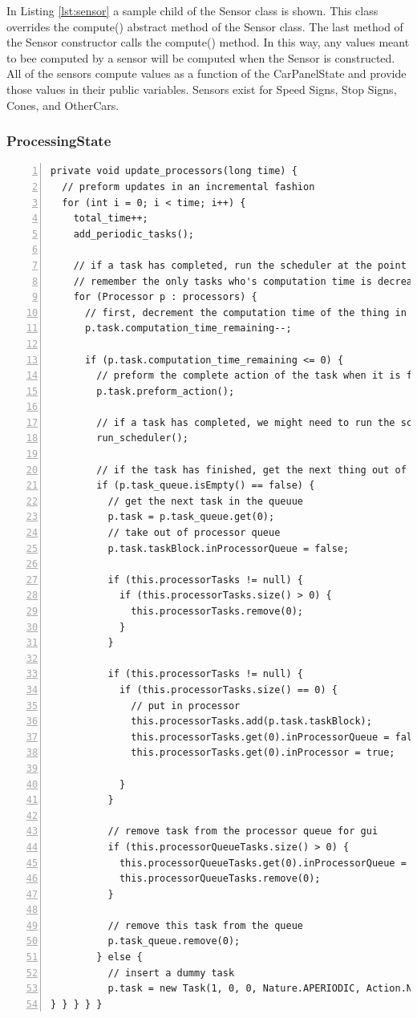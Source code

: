 \documentclass{article} %
\begin{document}
In Listing \ref{lst:sensor} a sample child of the Sensor class is shown.
This class overrides the compute() abstract method of the Sensor class. The last method of the Sensor constructor calls the compute() method.
In this way, any values meant to bee computed by a sensor will be computed when the Sensor is constructed.
All of the sensors compute values as a function of the CarPanelState and provide those values in their public variables.
Sensors exist for Speed Signs, Stop Signs, Cones, and OtherCars.

\subsubsection{ProcessingState}
\begin{lstlisting}[float=*,caption={Scheduler call and task queue manipulation},label={lst:ProcessingState},numbers=left]
private void update_processors(long time) {
  // preform updates in an incremental fashion
  for (int i = 0; i < time; i++) {
    total_time++;
    add_periodic_tasks();

    // if a task has completed, run the scheduler at the point it completes.
    // remember the only tasks who's computation time is decreasing are the ones in the processors.
    for (Processor p : processors) {
      // first, decrement the computation time of the thing in this processor
      p.task.computation_time_remaining--;

      if (p.task.computation_time_remaining <= 0) {
        // preform the complete action of the task when it is finished
        p.task.preform_action();

        // if a task has completed, we might need to run the scheduler
        run_scheduler();

        // if the task has finished, get the next thing out of the queue
        if (p.task_queue.isEmpty() == false) {
          // get the next task in the queuue
          p.task = p.task_queue.get(0);
          // take out of processor queue
          p.task.taskBlock.inProcessorQueue = false;

          if (this.processorTasks != null) {
            if (this.processorTasks.size() > 0) {
              this.processorTasks.remove(0);
            }
          }

          if (this.processorTasks != null) {
            if (this.processorTasks.size() == 0) {
              // put in processor
              this.processorTasks.add(p.task.taskBlock);
              this.processorTasks.get(0).inProcessorQueue = false;
              this.processorTasks.get(0).inProcessor = true;

            }
          }

          // remove task from the processor queue for gui
          if (this.processorQueueTasks.size() > 0) {
            this.processorQueueTasks.get(0).inProcessorQueue = false;
            this.processorQueueTasks.remove(0);
          }

          // remove this task from the queue
          p.task_queue.remove(0);
        } else {
          // insert a dummy task
          p.task = new Task(1, 0, 0, Nature.APERIODIC, Action.NONE, null, null, 0);
} } } } }
\end{lstlisting}
\end{document}
